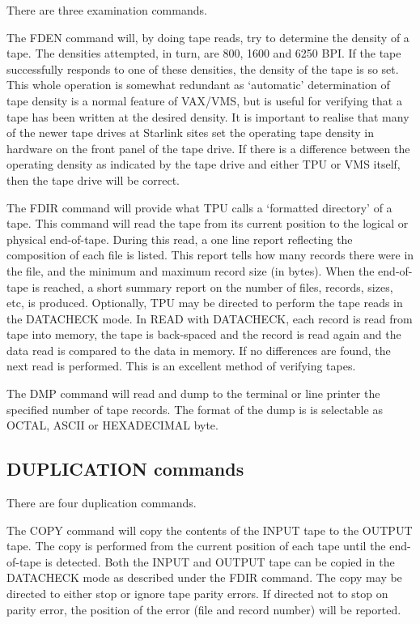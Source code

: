There are three examination commands.

The FDEN command will, by doing tape reads, try to determine the density of a
tape.
The densities attempted, in turn, are 800, 1600 and 6250 BPI.
If the tape successfully responds to one of these densities, the density of the
tape is so set.
This whole operation is somewhat redundant as `automatic' determination of tape
density is a normal feature of VAX/VMS, but is useful for verifying that a tape
has been written at the desired density.
It is important to realise that many of the newer tape drives at
Starlink sites set the operating tape density in hardware on the
front panel of the tape drive. If there is a difference between the
operating density as indicated by the tape drive and either
TPU or VMS itself, then the tape drive will be correct.

The FDIR command will provide what TPU calls a `formatted directory' of a tape.
This command will read the tape from its current position to the logical or
physical end-of-tape.
During this read, a one line report reflecting the composition of each file is
listed.
This report tells how many records there were in the file, and the minimum and
maximum record size (in bytes).
When the end-of-tape is reached, a short summary report on the number of files,
records, sizes, etc, is produced.
Optionally, TPU may be directed to perform the tape reads in the DATACHECK mode.
In READ with DATACHECK, each record is read from tape into memory, the tape is
back-spaced and the record is read again and the data read is compared to the
data in memory.
If no differences are found, the next read is performed.
This is an excellent method of verifying tapes.

The DMP command will read and dump to the terminal or line printer the specified
number of tape records.
The format of the dump is is selectable as OCTAL, ASCII or HEXADECIMAL byte.

\subsection{DUPLICATION commands}

There are four duplication commands.

The COPY command will copy the contents of the INPUT tape to the OUTPUT tape.
The copy is performed from the current position of each tape until the
end-of-tape is detected.
Both the INPUT and OUTPUT tape can be copied in the DATACHECK mode as described
under the FDIR command.
The copy may be directed to either stop or ignore tape parity errors.
If directed not to stop on parity error, the position of the error (file and
record number) will be reported.

